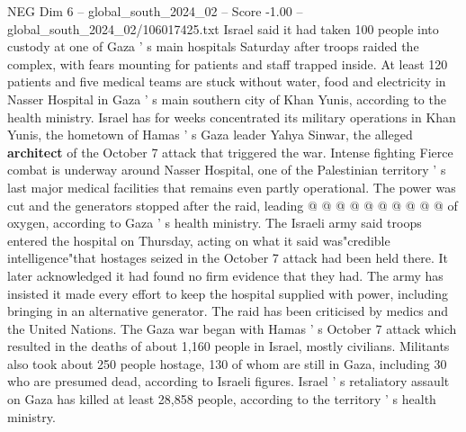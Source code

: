 \begin{textsample}{NEG Dim 6 – global\_south\_2024\_02 – Score -1.00 – global\_south\_2024\_02/106017425.txt}
Israel said it had taken 100 people into custody at one of Gaza ' s main hospitals Saturday after troops raided the complex, with fears mounting for patients and staff trapped inside.
At least 120 patients and five medical teams are stuck without water, food and electricity in Nasser Hospital in Gaza ' s main southern city of Khan Yunis, according to the health ministry.
Israel has for weeks concentrated its military operations in Khan Yunis, the hometown of Hamas ' s Gaza leader Yahya Sinwar, the alleged \textbf{architect} of the October 7 attack that triggered the war.
Intense fighting Fierce combat is underway around Nasser Hospital, one of the Palestinian territory ' s last major medical facilities that remains even partly operational.
The power was cut and the generators stopped after the raid, leading @ @ @ @ @ @ @ @ @ @ of oxygen, according to Gaza ' s health ministry.
The Israeli army said troops entered the hospital on Thursday, acting on what it said was"credible intelligence"that hostages seized in the October 7 attack had been held there.
It later acknowledged it had found no firm evidence that they had.
The army has insisted it made every effort to keep the hospital supplied with power, including bringing in an alternative generator.
The raid has been criticised by medics and the United Nations.
The Gaza war began with Hamas ' s October 7 attack which resulted in the deaths of about 1,160 people in Israel, mostly civilians.
Militants also took about 250 people hostage, 130 of whom are still in Gaza, including 30 who are presumed dead, according to Israeli figures.
Israel ' s retaliatory assault on Gaza has killed at least 28,858 people, according to the territory ' s health ministry.

\end{textsample}
